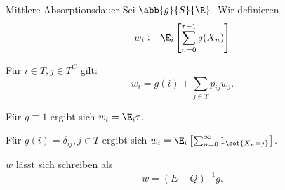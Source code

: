 \begin{karte}{Mittlere Absorptionsdauer}
    Sei \(\abb{g}{S}{\R}\). Wir definieren 
    \[ w_i := \E_i \left[ \sum_{n=0}^{\tau - 1} g(X_n) \right] \]

    Für \(i\in T, j\in T^C\) gilt: 
    \[ w_i = g(i) + \sum_{j\in T} p_{ij} w_j. \]

    Für \(g \equiv 1\) ergibt sich \(w_i = \E_i \tau\).
    
    Für \(g(i) = \delta_{ij}, j\in T\) ergibt sich \(w_i = \E_i \left[\sum_{n=0}^\infty 1_{\set{X_n = j}}\right]\).

    \(w\) lässt sich schreiben als 
    \[ w = (E - Q)^{-1} g. \]
\end{karte}